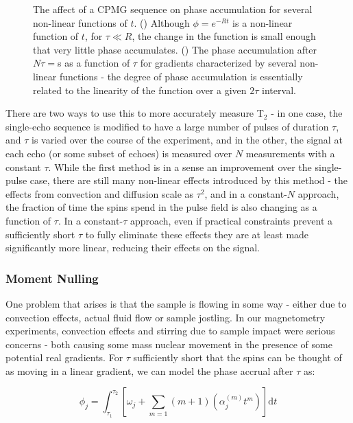 \documentclass[PaulGanssle-Thesis.tex]{subfiles}
\begin{document}
\begin{figure}
\caption{The affect of a CPMG sequence on phase accumulation for several non-linear functions of $t$. () Although $\phi = e^{-Rt}$ is a non-linear function of $t$, for $\tau \ll R$, the change in the function is small enough that very little phase accumulates. () The phase accumulation after $N\tau = $\unit[2]{s} as a function of $\tau$ for gradients characterized by several non-linear functions - the degree of phase accumulation is essentially related to the linearity of the function over a given $2\tau$ interval.}
\label{fig:CPMGRefocus}
\end{figure}

There are two ways to use this to more accurately measure T$_{2}$ - in one case, the single-echo sequence is modified to have a large number of pulses of duration $\tau$, and $\tau$ is varied over the course of the experiment, and in the other, the signal at each echo (or some subset of echoes) is measured over $N$ measurements with a constant $\tau$. While the first method is in a sense an improvement over the single-pulse case, there are still many non-linear effects introduced by this method - the effects from convection and diffusion scale as $\tau^2$, and in a constant-$N$ approach, the fraction of time the spins spend in the pulse field is also changing as a function of $\tau$. In a constant-$\tau$ approach, even if practical constraints prevent a sufficiently short $\tau$ to fully eliminate these effects they are at least made significantly more linear, reducing their effects on the signal.   

\subsubsection{Moment Nulling}
\label{relaxometry.t2.cpmg.nulling}
One problem that arises is that the sample is flowing in some way - either due to convection effects, actual fluid flow or sample jostling. In our magnetometry experiments, convection effects and stirring due to sample impact were serious concerns - both causing some mass nuclear movement in the presence of some potential real gradients. For $\tau$ sufficiently short that the spins can be thought of as moving in a linear gradient, we can model the phase accrual after $\tau$ as:\cite{carr-purcell-1954}

\begin{equation}
\phi_{j} = \int_{\tau_{1}}^{\tau_{2}}\left[\omega_{j} + \sum_{m=1}\left(m+1\right)\left(\alpha_{j}^{(m)}t^{m}\right)\right]\mathrm{d}t
\label{eqn:PhaseAccrualMovementTauInt}
\end{equation}
\end{document}
